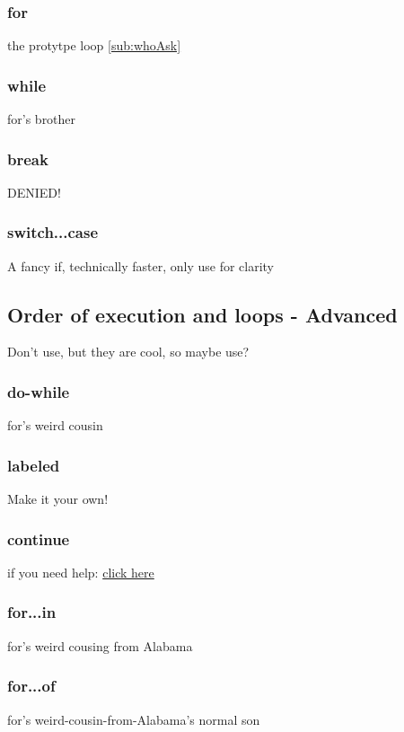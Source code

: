 \subsubsection{for}
\label{subsub:for}
the protytpe loop \ref{sub:whoAsk}

\subsubsection{while}
\label{sub:while}
for's brother

\subsubsection{break}
\label{subsub:break}
DENIED!

\subsubsection{switch...case}
\label{subsub:switch}
A fancy if, technically faster, only use for clarity

\subsection{Order of execution and loops - Advanced}
\label{sub:execAdv}
Don't use, but they are cool, so maybe use?
\subsubsection{do-while}
\label{subsub:doWhile}
for's weird cousin

\subsubsection{labeled}
\label{subsub:labeled}
Make it your own!

\subsubsection{continue}
\label{subsub:continue}
if you need help: \href{http://letmegooglethat.com/?q=continue}{click here}

\subsubsection{for...in}
\label{subsub:forIn}
for's weird cousing from Alabama

\subsubsection{for...of}
\label{subsub:forOf}
for's weird-cousin-from-Alabama's normal son

